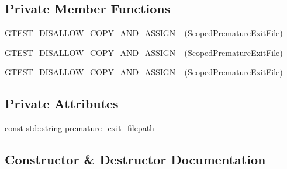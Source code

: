 \subsection*{Private Member Functions}
\begin{DoxyCompactItemize}
\item 
\mbox{\hyperlink{classtesting_1_1internal_1_1_scoped_premature_exit_file_a4c7a2d9d5a94035756b97b5c1e0c2597}{G\+T\+E\+S\+T\+\_\+\+D\+I\+S\+A\+L\+L\+O\+W\+\_\+\+C\+O\+P\+Y\+\_\+\+A\+N\+D\+\_\+\+A\+S\+S\+I\+G\+N\+\_\+}} (\mbox{\hyperlink{classtesting_1_1internal_1_1_scoped_premature_exit_file}{Scoped\+Premature\+Exit\+File}})
\item 
\mbox{\hyperlink{classtesting_1_1internal_1_1_scoped_premature_exit_file_a4c7a2d9d5a94035756b97b5c1e0c2597}{G\+T\+E\+S\+T\+\_\+\+D\+I\+S\+A\+L\+L\+O\+W\+\_\+\+C\+O\+P\+Y\+\_\+\+A\+N\+D\+\_\+\+A\+S\+S\+I\+G\+N\+\_\+}} (\mbox{\hyperlink{classtesting_1_1internal_1_1_scoped_premature_exit_file}{Scoped\+Premature\+Exit\+File}})
\item 
\mbox{\hyperlink{classtesting_1_1internal_1_1_scoped_premature_exit_file_a4c7a2d9d5a94035756b97b5c1e0c2597}{G\+T\+E\+S\+T\+\_\+\+D\+I\+S\+A\+L\+L\+O\+W\+\_\+\+C\+O\+P\+Y\+\_\+\+A\+N\+D\+\_\+\+A\+S\+S\+I\+G\+N\+\_\+}} (\mbox{\hyperlink{classtesting_1_1internal_1_1_scoped_premature_exit_file}{Scoped\+Premature\+Exit\+File}})
\end{DoxyCompactItemize}
\subsection*{Private Attributes}
\begin{DoxyCompactItemize}
\item 
const std\+::string \mbox{\hyperlink{classtesting_1_1internal_1_1_scoped_premature_exit_file_ae5de9d1739a0adb381659321ca250d90}{premature\+\_\+exit\+\_\+filepath\+\_\+}}
\end{DoxyCompactItemize}


\subsection{Constructor \& Destructor Documentation}
\mbox{\label{classtesting_1_1internal_1_1_scoped_premature_exit_file_ae520883b8a6984a864ce675acedff4a2}} 
